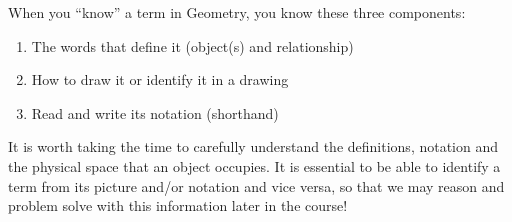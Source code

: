 When you ``know'' a term in Geometry, you know these three components:

\begin{enumerate}
\item The words that define it (object(s) and relationship)
\item How to draw it or identify it in a drawing
\item Read and write its notation (shorthand)
\end{enumerate}

It is worth taking the time to carefully understand the definitions, notation and the physical space that an object occupies.  It is essential to be able to identify a term from its picture and/or notation and vice versa, so that we may reason and problem solve with this information later in the course!

